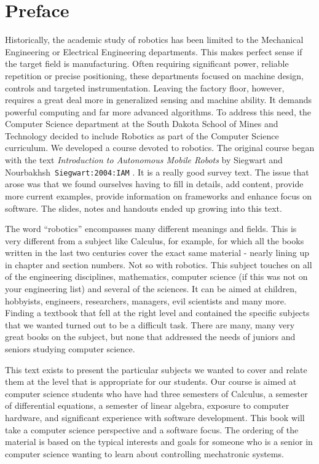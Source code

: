 \hypertarget{Chap:Preface}{%
\section{Preface}\label{Chap:Preface}}

Historically, the academic study of robotics has been limited to the
Mechanical Engineering or Electrical Engineering departments. This makes
perfect sense if the target field is manufacturing. Often requiring
significant power, reliable repetition or precise positioning, these
departments focused on machine design, controls and targeted
instrumentation. Leaving the factory floor, however, requires a great
deal more in generalized sensing and machine ability. It demands
powerful computing and far more advanced algorithms. To address this
need, the Computer Science department at the South Dakota School of
Mines and Technology decided to include Robotics as part of the Computer
Science curriculum. We developed a course devoted to robotics. The
original course began with the text \emph{Introduction to Autonomous
Mobile Robots} by Siegwart and Nourbakhsh~\texttt{Siegwart:2004:IAM} .
It is a really good survey text. The issue that arose was that we found
ourselves having to fill in details, add content, provide more current
examples, provide information on frameworks and enhance focus on
software. The slides, notes and handouts ended up growing into this
text.

The word ``robotics'' encompasses many different meanings and fields.
This is very different from a subject like Calculus, for example, for
which all the books written in the last two centuries cover the exact
same material - nearly lining up in chapter and section numbers. Not so
with robotics. This subject touches on all of the engineering
disciplines, mathematics, computer science (if this was not on your
engineering list) and several of the sciences. It can be aimed at
children, hobbyists, engineers, researchers, managers, evil scientists
and many more. Finding a textbook that fell at the right level and
contained the specific subjects that we wanted turned out to be a
difficult task. There are many, many very great books on the subject,
but none that addressed the needs of juniors and seniors studying
computer science.

This text exists to present the particular subjects we wanted to cover
and relate them at the level that is appropriate for our students. Our
course is aimed at computer science students who have had three
semesters of Calculus, a semester of differential equations, a semester
of linear algebra, exposure to computer hardware, and significant
experience with software development. This book will take a computer
science perspective and a software focus. The ordering of the material
is based on the typical interests and goals for someone who is a senior
in computer science wanting to learn about controlling mechatronic
systems.

